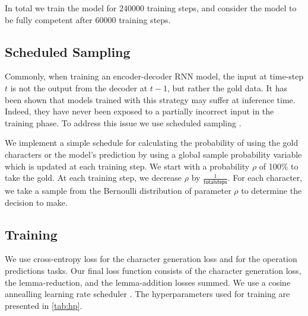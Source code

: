 \documentclass[11pt,a4paper]{article}
\newcommand\jp[1]{\textbf{JP: #1}}
\begin{document}
In total we train the model for $240 000$ training steps, and consider
the model to be fully competent after $60 000$ training steps.




\subsection{Scheduled Sampling}

Commonly, when training an encoder-decoder RNN model, the input at
time-step $t$ is not the output from the decoder at $t-1$, but rather
the gold data.  It has been shown that models trained with this
strategy may suffer at inference time. Indeed, they have never been
exposed to a partially incorrect input in the training phase.  To
address this issue we use scheduled sampling
\cite{DBLP:conf/nips/BengioVJS15}.

We implement a simple schedule for calculating the probability of
using the gold characters or the model's prediction by using a global
sample probability variable which is updated at each training step. We
start with a probability \(\rho\) of 100\% to take the gold. At each
training step, we decrease \(\rho\) by
$\frac{1}{\mathsf{total steps}}$. For each character, we take a sample
from the Bernoulli distribution of parameter \(\rho\) to determine the
decision to make.

\subsection{Training}

We use cross-entropy loss for the character generation loss and 
for the operation predictions tasks. Our final loss function consists
of the character generation loss, the lemma-reduction, and the
lemma-addition losses summed. We use a cosine annealling learning rate
scheduler \cite{DBLP:conf/iclr/LoshchilovH17}. The hyperparameters
used for training are presented in \cref{tab:hp}.
\end{document}
